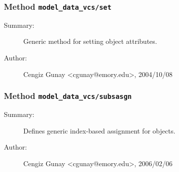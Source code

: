 \subsubsection[Method \texttt{set}]{Method \texttt{model\_data\_vcs/set}}%
%
\label{ref_model_data_vcs__set}%
\hypertarget{ref_model_data_vcs__set}{}%
\begin{description}
\item[Summary:]Generic method for setting object attributes.
%
%
%
%
%
%
%
\item[Author:]%
Cengiz Gunay <cgunay@emory.edu>, 2004/10/08
%
\end{description}
\methodline%
\subsubsection[Method \texttt{subsasgn}]{Method \texttt{model\_data\_vcs/subsasgn}}%
%
\label{ref_model_data_vcs__subsasgn}%
\hypertarget{ref_model_data_vcs__subsasgn}{}%
\begin{description}
\item[Summary:]Defines generic index-based assignment for objects.
%
%
%
%
%
%
%
\item[Author:]%
Cengiz Gunay <cgunay@emory.edu>, 2006/02/06
%
\end{description}
\methodline%
